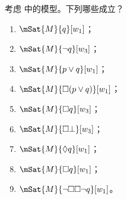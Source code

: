 \documentclass[../../../include/open-logic-section]{subfiles}
\begin{document}
\begin{prob}
  考虑  中的模型。下列哪些成立？
    \begin{enumerate}
    \item $\mSat{M}{q}[w_1]$；
    \item $\mSat{M}{\lnot q}[w_3]$；
    \item $\mSat{M}{p \lor q}[w_1]$；
    \item $\mSat{M}{\Box (p \lor q)}[w_1]$；
    \item $\mSat{M}{\Box q}[w_3]$；
    \item $\mSat{M}{\Box \bot}[w_3]$；
    \item $\mSat{M}{\Diamond q}[w_1]$；
    \item $\mSat{M}{\Box q}[w_1]$；
    \item $\mSat{M}{\lnot \Box\Box \lnot q}[w_1]$。
    \end{enumerate}
\end{prob}

\end{document}
